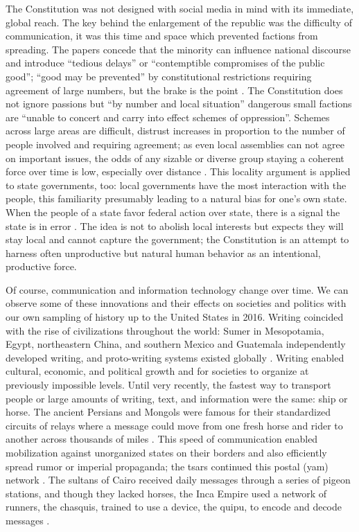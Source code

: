 The Constitution was not designed with social media in mind with its immediate, global reach.
The key behind the enlargement of the republic was the difficulty of communication, it was this time and space which prevented factions from spreading.
The papers concede that the minority can influence national discourse and introduce ``tedious delays'' or ``contemptible compromises of the public good''; ``good may be prevented'' by constitutional restrictions requiring agreement of large numbers, but the brake is the point \cite[n. 22]{fed}.
The Constitution does not ignore passions but ``by number and local situation'' dangerous small factions are ``unable to concert and carry into effect schemes of oppression''. 
Schemes across large areas are difficult, distrust increases in proportion to the number of people involved and requiring agreement; as even local assemblies can not agree on important issues, the odds of any sizable or diverse group staying a coherent force over time is low, especially over distance \cite[n. 10]{fed}.
This locality argument is applied to state governments, too: local governments have the most interaction with the people, this familiarity presumably leading to a natural bias for one's own state.
When the people of a state favor federal action over state, there is a signal the state is in error \cite[n. 17, p. 109]{fed}.
The idea is not to abolish local interests but expects they will stay local and cannot capture the government; the Constitution is an attempt to harness often unproductive but natural human behavior as an intentional, productive force. 

Of course, communication and information technology change over time.
We can observe some of these innovations and their effects on societies and politics with our own sampling of history up to the United States in 2016.
Writing coincided with the rise of civilizations throughout the world: Sumer in Mesopotamia, Egypt, northeastern China, and southern Mexico and Guatemala independently developed writing, and proto-writing systems existed globally \cite{fischer2003}.
Writing enabled cultural, economic, and political growth and for societies to organize at previously impossible levels. 
Until very recently, the fastest way to transport people or large amounts of writing, text, and information were the same: ship or horse.
The ancient Persians and Mongols were famous for their standardized circuits of relays where a message could move from one fresh horse and rider to another across thousands of miles \cite[8.98]{herodotus} \cite{shim2014}.
This speed of communication enabled mobilization against unorganized states on their borders and also efficiently spread rumor or imperial propaganda; the tsars continued this postal (yam) network \cite{smith1970}.
The sultans of Cairo received daily messages through a series of pigeon stations, and though they lacked horses, the Inca Empire used a network of runners, the chasquis, trained to use a device, the quipu, to encode and decode messages \cite[p. 60]{bloom2001} \cite[pp. 14-15]{fischer2003}.

